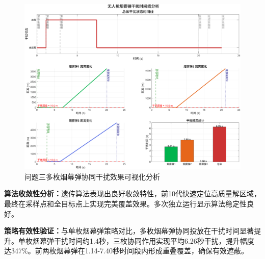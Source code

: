 \begin{figure}[htbp]
\centering
\includegraphics[width=\textwidth]{figures/A_3_1.png}
\caption{问题三多枚烟幕弹协同干扰效果可视化分析}
\label{fig:q3_visualization}
\end{figure}

\textbf{算法收敛性分析：}遗传算法表现出良好收敛特性，前10代快速定位高质量解区域，最终在采样点和全目标点上实现完美覆盖效果。多次独立运行显示算法稳定性良好。

\textbf{策略有效性验证：}与单枚烟幕弹策略对比，多枚烟幕弹协同投放在干扰时间显著提升。单枚烟幕弹干扰时间约1.4秒，三枚协同作用实现平均6.26秒干扰，提升幅度达347\%。前两枚烟幕弹在1.14-7.40秒时间段内形成重叠覆盖，确保有效遮蔽。